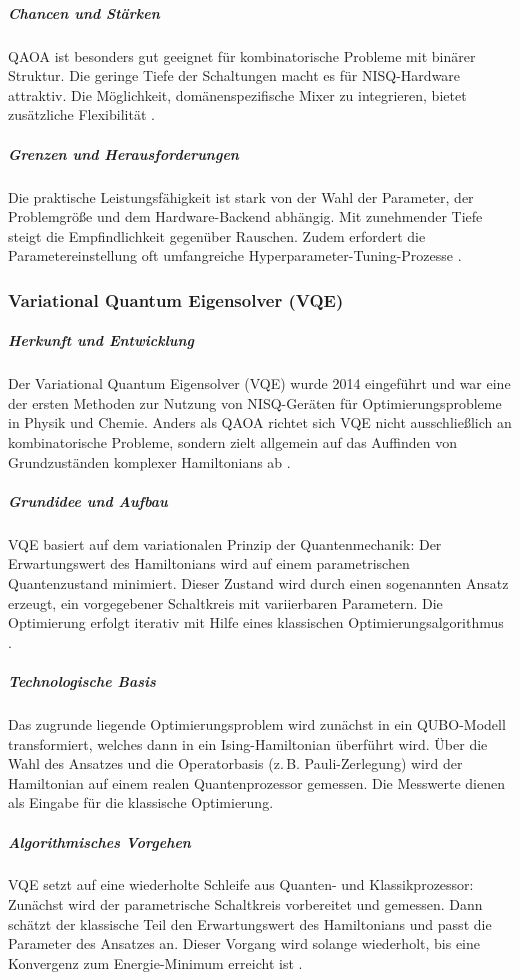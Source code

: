 \subparagraph{Chancen und Stärken}
QAOA ist besonders gut geeignet für kombinatorische Probleme mit binärer Struktur. Die geringe Tiefe der Schaltungen macht es für NISQ-Hardware attraktiv. Die Möglichkeit, domänenspezifische Mixer zu integrieren, bietet zusätzliche Flexibilität \cite{brandhofer_benchmarking_2022}.

\subparagraph{Grenzen und Herausforderungen}
Die praktische Leistungsfähigkeit ist stark von der Wahl der Parameter, der Problemgröße und dem Hardware-Backend abhängig. Mit zunehmender Tiefe steigt die Empfindlichkeit gegenüber Rauschen. Zudem erfordert die Parametereinstellung oft umfangreiche Hyperparameter-Tuning-Prozesse \cite{buonaiuto_best_2023}.

\subsubsection*{Variational Quantum Eigensolver (VQE)}

\subparagraph{Herkunft und Entwicklung}
Der Variational Quantum Eigensolver (VQE) wurde 2014 eingeführt und war eine der ersten Methoden zur Nutzung von NISQ-Geräten für Optimierungsprobleme in Physik und Chemie. Anders als QAOA richtet sich VQE nicht ausschließlich an kombinatorische Probleme, sondern zielt allgemein auf das Auffinden von Grundzuständen komplexer Hamiltonians ab \cite{buonaiuto_best_2023}.

\subparagraph{Grundidee und Aufbau}
VQE basiert auf dem variationalen Prinzip der Quantenmechanik: Der Erwartungswert des Hamiltonians wird auf einem parametrischen Quantenzustand minimiert. Dieser Zustand wird durch einen sogenannten Ansatz erzeugt, ein vorgegebener Schaltkreis mit variierbaren Parametern. Die Optimierung erfolgt iterativ mit Hilfe eines klassischen Optimierungsalgorithmus \cite{buonaiuto_best_2023}.

\subparagraph{Technologische Basis}
Das zugrunde liegende Optimierungsproblem wird zunächst in ein QUBO-Modell transformiert, welches dann in ein Ising-Hamiltonian überführt wird. Über die Wahl des Ansatzes und die Operatorbasis (z.\,B. Pauli-Zerlegung) wird der Hamiltonian auf einem realen Quantenprozessor gemessen. Die Messwerte dienen als Eingabe für die klassische Optimierung.

\subparagraph{Algorithmisches Vorgehen}
VQE setzt auf eine wiederholte Schleife aus Quanten- und Klassikprozessor: Zunächst wird der parametrische Schaltkreis vorbereitet und gemessen. Dann schätzt der klassische Teil den Erwartungswert des Hamiltonians und passt die Parameter des Ansatzes an. Dieser Vorgang wird solange wiederholt, bis eine Konvergenz zum Energie-Minimum erreicht ist \cite{buonaiuto_best_2023}.


